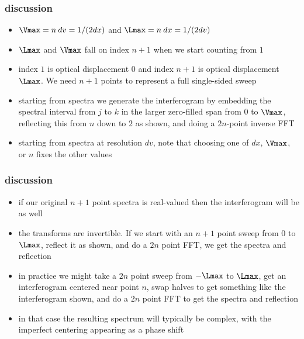 \documentclass[11pt]{beamer}
\begin{document}
\begin{frame}
\frametitle{discussion}

\begin{itemize}

  \item $\Vmax = n\: dv = 1/(2\/dx)$ and $\Lmax = n\: dx =
    1/(2\/dv)$

  \item $\Lmax$ and $\Vmax$ fall on index $n+1$ when we start
    counting from $1$

  \item index $1$ is optical displacement 0 and index $n+1$ is
    optical displacement $\Lmax$.  We need $n+1$ points to represent
    a full single-sided sweep

  \item starting from spectra we generate the interferogram by
    embedding the spectral interval from $j$ to $k$ in the larger
    zero-filled span from $0$ to $\Vmax$, reflecting this from $n$
    down to $2$ as shown, and doing a $2n$-point inverse FFT

  \item starting from spectra at resolution $dv$, note that choosing
    one of $dx$, $\Vmax$, or $n$ fixes the other values

\end{itemize}

\end{frame}
\begin{frame}
\frametitle{discussion}

\begin{itemize}

  \item if our original $n+1$ point spectra is real-valued then the
    interferogram will be as well

  \item the transforms are invertible.  If we start with an $n+1$
    point sweep from $0$ to $\Lmax$, reflect it as shown, and do a
    $2n$ point FFT, we get the spectra and reflection

  \item in practice we might take a $2n$ point sweep from $-\Lmax$
    to $\Lmax$, get an interferogram centered near point $n$, swap
    halves to get something like the interferogram shown, and do a
    $2n$ point FFT to get the spectra and reflection

  \item in that case the resulting spectrum will typically be
    complex, with the imperfect centering appearing as a phase
    shift
    
\end{itemize}

\end{frame}
\end{document}
